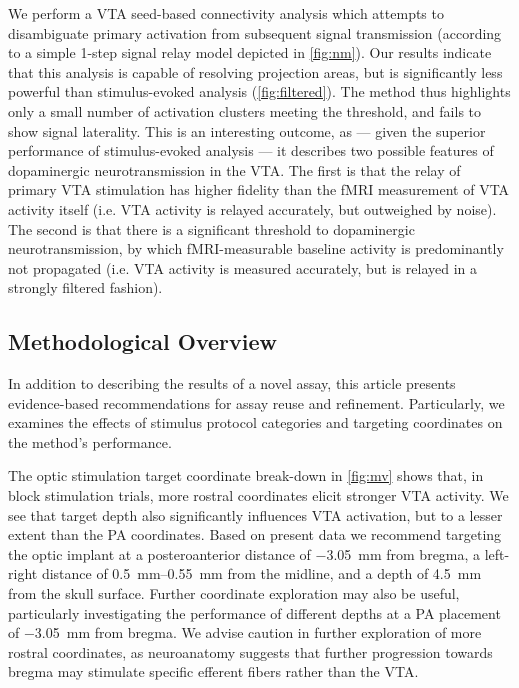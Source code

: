 We perform a VTA seed-based connectivity analysis which attempts to disambiguate primary activation from subsequent signal transmission (according to a simple 1-step signal relay model depicted in \cref{fig:nm}).
Our results indicate that this analysis is capable of resolving projection areas, but is significantly less powerful than stimulus-evoked analysis (\cref{fig:filtered}).
The method thus highlights only a small number of activation clusters meeting the threshold, and fails to show signal laterality.
This is an interesting outcome, as --- given the superior performance of stimulus-evoked analysis --- it describes two possible features of dopaminergic neurotransmission in the VTA.
The first is that the relay of primary VTA stimulation has higher fidelity than the fMRI measurement of VTA activity itself (i.e. VTA activity is relayed accurately, but outweighed by noise).
The second is that there is a significant threshold to dopaminergic neurotransmission, by which fMRI-measurable baseline activity is predominantly not propagated (i.e. VTA activity is measured accurately, but is relayed in a strongly filtered fashion).

\subsection{Methodological Overview}

In addition to describing the results of a novel assay, this article presents evidence-based recommendations for assay reuse and refinement.
Particularly, we examines the effects of stimulus protocol categories and targeting coordinates on the method's performance.

The optic stimulation target coordinate break-down in \cref{fig:mv} shows that, in block stimulation trials, more rostral coordinates elicit stronger VTA activity.
We see that target depth also significantly influences VTA activation, but to a lesser extent than the PA coordinates.
Based on present data we recommend targeting the optic implant at
a posteroanterior distance of \SI{-3.05}{\milli\meter} from bregma,
a left-right distance of \SIrange{0.5}{0.55}{\milli\meter} from the midline,
and a depth of \SI{4.5}{\milli\meter} from the skull surface.
Further coordinate exploration may also be useful, particularly investigating the performance of different depths at a PA placement of \SI{-3.05}{\milli\meter} from bregma.
We advise caution in further exploration of more rostral coordinates, as neuroanatomy suggests that further progression towards bregma may stimulate specific efferent fibers rather than the VTA.

